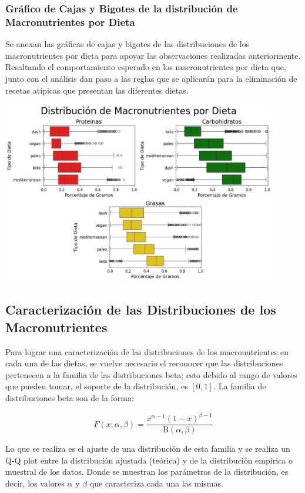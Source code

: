 \documentclass[12pt,a4paper]{article}
\begin{document}
        \subsubsection{Gráfico de Cajas y Bigotes de la distribución de Macronutrientes por Dieta}
            Se anexan las gráficas de cajas y bigotes de las distribuciones de los 
            macronutrientes por dieta para apoyar las observaciones realizadas anteriormente. 
            Resaltando el comportamiento esperado en los macronutrientes por dieta que, junto 
            con el análisis dan paso a las reglas que se aplicarán para la eliminación de recetas 
            atípicas que presentan las diferentes dietas.

            \begin{center}
                \includegraphics[width=0.90\textwidth]{Resources/2_03_plot_06.png}
            \end{center}
    
    \subsection{Caracterización de las Distribuciones de los Macronutrientes}
        Para lograr una caracterización de las distribuciones de los macronutrientes 
        en cada una de las dietas, se vuelve necesario el reconocer que las distribuciones 
        pertenecen a la familia de las distribuciones beta; esto debido al rango de valores 
        que pueden tomar, el soporte de la distribución, es $[0,1]$. La familia de distribuciones 
        beta son de la forma\cite{beta_distribution}:

        $$F(x;\alpha,\beta) = \frac {x^{\alpha -1}(1-x)^{\beta -1}}{\mathrm {B} (\alpha ,\beta )}$$ 

        Lo que se realiza es el ajuste de una distribución de esta familia y se realiza 
        un Q-Q plot entre la distribución ajustada (teórica) y de la distribución empírica 
        o muestral de los datos. Donde se muestran los parámetros de la distribución, es 
        decir, los valores $\alpha$ y $\beta$ que caracteriza cada una las mismas.\\
\end{document}
